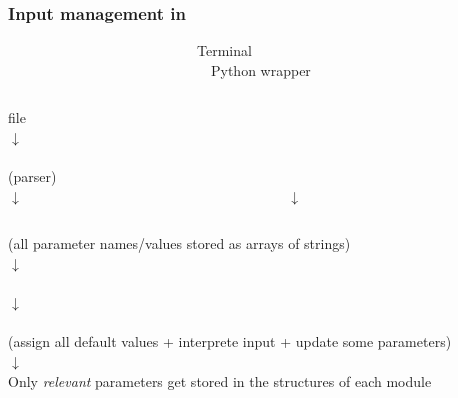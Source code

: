 \begin{frame}[fragile]
	\frametitle{Input management in {\Red \CLASS{}}}
	
	\begin{block}{~~~~~~~~~~~~~~~~~~~~~~~~~~~Terminal~~~~~~~~~~~~~~~~~~~~~~~~~~~~~~~~~~~~~~~~~~~~~~~~~~~~~~~~~~~~~~~~~~Python wrapper}
		\begin{columns}
			\begin{column}{0.5\textwidth} 
				\begin{center}
					file \\
					$\downarrow$\\
					\\
					(parser)\\
					$\downarrow$\\
				\end{center}
			\end{column}
			\begin{column}{0.5\textwidth} 
				\begin{center}
					\mbox{ }\\
					\mbox{ }\\
					\mbox{ }\\
					\\
					$\downarrow$\\
				\end{center}
			\end{column}
		\end{columns}
		\vspace{-0.3cm}
		\begin{center}
			 (all parameter names/values stored as arrays of strings)\\
			$\downarrow$\\
			\\
			$\downarrow$\\
			\\
			(assign all default values + interprete input + update some parameters)\\
			$\downarrow$\\
			Only {\it relevant} parameters get stored in the structures of each module
		\end{center}
	\end{block}
\end{frame}

